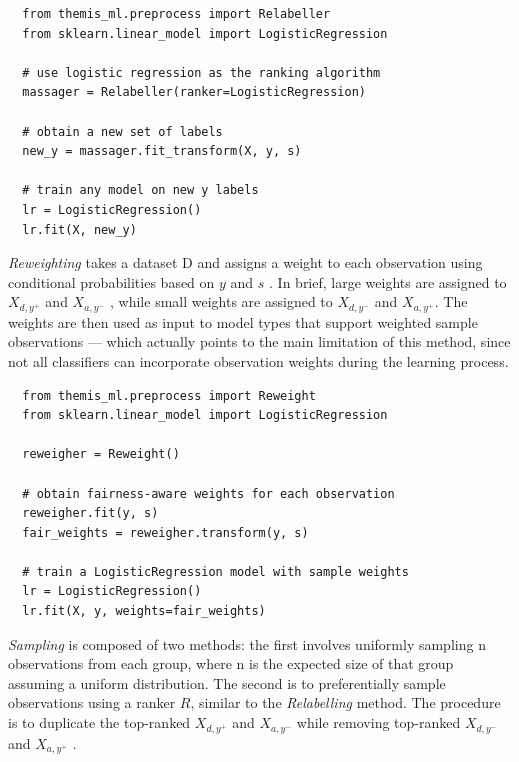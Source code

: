 \documentclass{{interact/interact}}
\begin{document}
\begin{verbatim}
  from themis_ml.preprocess import Relabeller
  from sklearn.linear_model import LogisticRegression

  # use logistic regression as the ranking algorithm
  massager = Relabeller(ranker=LogisticRegression)

  # obtain a new set of labels
  new_y = massager.fit_transform(X, y, s)

  # train any model on new y labels
  lr = LogisticRegression()
  lr.fit(X, new_y)
\end{verbatim}

\emph{Reweighting} takes a dataset D and assigns a weight to each observation
using conditional probabilities based on \(y\) and \(s\) \cite{kamiran2012data}.
In brief, large weights are assigned to \(X_{d, y^{+}}\) and \(X_{a, y^{-}}\) ,
while small weights are assigned to \(X_{d, y^{-}}\) and \(X_{a, y^{+}}\). The
weights are then used as input to model types that support weighted sample
observations --- which actually points to the main limitation of this method,
since not all classifiers can incorporate observation weights during the
learning process.

\begin{verbatim}
  from themis_ml.preprocess import Reweight
  from sklearn.linear_model import LogisticRegression

  reweigher = Reweight()

  # obtain fairness-aware weights for each observation
  reweigher.fit(y, s)
  fair_weights = reweigher.transform(y, s)

  # train a LogisticRegression model with sample weights
  lr = LogisticRegression()
  lr.fit(X, y, weights=fair_weights)
\end{verbatim}

\emph{Sampling} is composed of two methods: the first involves uniformly
sampling n observations from each group, where n is the expected size of that
group assuming a uniform distribution. The second is to preferentially sample
observations using a ranker \(R\), similar to the \emph{Relabelling} method. The
procedure is to duplicate the top-ranked \(X_{d, y^{+}}\) and \(X_{a, y^{-}}\)
while removing top-ranked \(X_{d, y^{-}}\) and \(X_{a, y^{+}}\)
\cite{kamiran2012data}.
\end{document}

